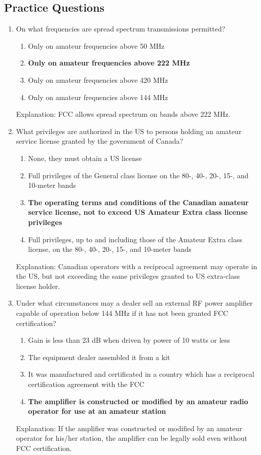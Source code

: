 \subsection*{Practice Questions}
\begin{enumerate}
    \item On what frequencies are spread spectrum transmissions permitted?
        \begin{enumerate}
        \item Only on amateur frequencies above 50 MHz
    \item \textbf {Only on amateur frequencies above 222 MHz}
      \item  Only on amateur frequencies above 420 MHz
        \item  Only on amateur frequencies above 144 MHz
    \end{enumerate}
     \textcolor{myred}{Explanation:}
        FCC allows spread spectrum on bands above 222 MHz.

     \item What privileges are authorized in the US to persons holding an amateur service license granted by the government of Canada?
     \begin{enumerate}
          \item None, they must obtain a US license
       \item  Full privileges of the General class license on the 80-, 40-, 20-, 15-, and 10-meter bands
       \item \textbf {The operating terms and conditions of the Canadian amateur service license, not to exceed US Amateur Extra class license privileges}
     \item  Full privileges, up to and including those of the Amateur Extra class license, on the 80-, 40-, 20-, 15-, and 10-meter bands
        \end{enumerate}
    \textcolor{myred}{Explanation:}
     Canadian operators with a reciprocal agreement may operate in the US, but not exceeding the same privileges granted to US extra-class license holder.
    
     \item Under what circumstances may a dealer sell an external RF power amplifier capable of operation below 144 MHz if it has not been granted FCC certification?
    \begin{enumerate}
    \item Gain is less than 23 dB when driven by power of 10 watts or less
    \item  The equipment dealer assembled it from a kit
   \item  It was manufactured and certificated in a country which has a reciprocal certification agreement with the FCC
      \item \textbf {The amplifier is constructed or modified by an amateur radio operator for use at an amateur station}
   \end{enumerate}
        \textcolor{myred}{Explanation:}
     If the amplifier was constructed or modified by an amateur operator for his/her station, the amplifier can be legally sold even without FCC certification.
     

\end{enumerate}
